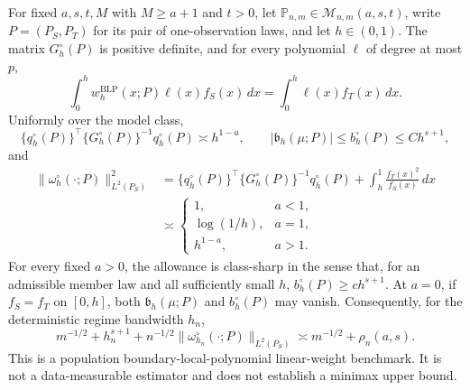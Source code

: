 For fixed \(a,s,t,M\) with \(M\ge a+1\) and \(t>0\), let \(\mathbb P_{n,m}\in\mathcal M_{n,m}(a,s,t)\), write \(P=(P_S,P_T)\) for its pair of one-observation laws, and let \(h\in(0,1)\). The matrix \(G_h^{\circ}(P)\) is positive definite, and for every polynomial \(\ell\) of degree at most \(p\),
\[
\int_0^h w_h^{\mathrm{BLP}}(x;P)\ell(x)f_S(x)\,dx
=\int_0^h\ell(x)f_T(x)\,dx.
\]
Uniformly over the model class,
\[
\{q_h^{\circ}(P)\}^{\top}\{G_h^{\circ}(P)\}^{-1}q_h^{\circ}(P)\asymp h^{1-a},
\qquad
|\mathfrak b_h(\mu;P)|\le b_h^{\circ}(P)\le C h^{s+1},
\]
and
\[
\begin{aligned}
\|\omega_h^{\circ}(\cdot;P)\|_{L^2(P_S)}^2
&=\{q_h^{\circ}(P)\}^{\top}\{G_h^{\circ}(P)\}^{-1}q_h^{\circ}(P)
+\int_h^1\frac{f_T(x)^2}{f_S(x)}\,dx\\
&\asymp
\begin{cases}
1,&a<1,\\
\log(1/h),&a=1,\\
h^{1-a},&a>1.
\end{cases}
\end{aligned}
\]
For every fixed \(a>0\), the allowance is class-sharp in the sense that, for an admissible member law and all sufficiently small \(h\), \(b_h^{\circ}(P)\ge c h^{s+1}\). At \(a=0\), if \(f_S=f_T\) on \([0,h]\), both \(\mathfrak b_h(\mu;P)\) and \(b_h^{\circ}(P)\) may vanish. Consequently, for the deterministic regime bandwidth \(h_n\),
\[
m^{-1/2}+h_n^{s+1}+n^{-1/2}\|\omega_{h_n}^{\circ}(\cdot;P)\|_{L^2(P_S)}
\asymp m^{-1/2}+\rho_n(a,s).
\]
This is a population boundary-local-polynomial linear-weight benchmark. It is not a data-measurable estimator and does not establish a minimax upper bound.